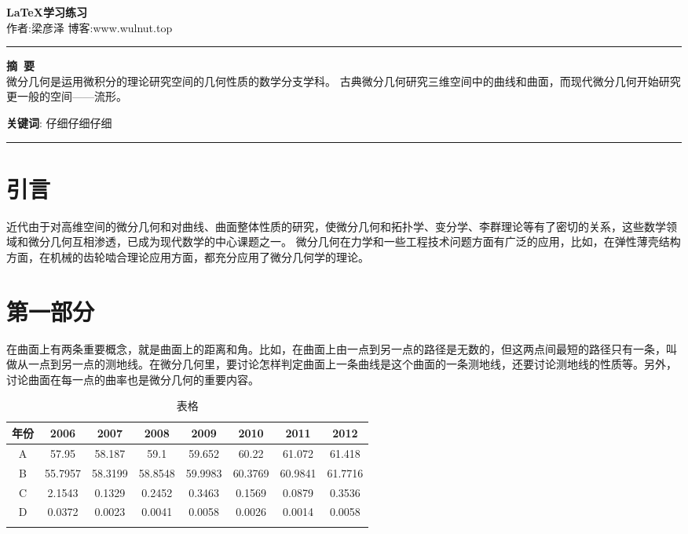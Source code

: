 \documentclass[UTF8, a4paper, 12pt]{ctexart}
\begin{document}

\begin{center}
\LARGE
    \textbf{\LaTeX{}学习练习} \\
    \vspace{0.2em}
    \large
    作者:梁彦泽 \hspace{1cm} 博客:www.wulnut.top \\
    \rule[0.5 \baselineskip]{\textwidth}{0.5pt}
\end{center}




\textbf{摘\ 要} \\
\large
微分几何是运用微积分的理论研究空间的几何性质的数学分支学科。
古典微分几何研究三维空间中的曲线和曲面，而现代微分几何开始研究更一般的空间——流形。


\textbf{关键词}: 仔细\quad 仔细\quad 仔细\quad \\

\begin{center}
\rule[0.1 \baselineskip]{\textwidth}{0.5pt}
\end{center}

\section{引言}
\indent
近代由于对高维空间的微分几何和对曲线、曲面整体性质的研究，使微分几何和拓扑学、变分学、李群理论等有了密切的关系，这些数学领域和微分几何互相渗透，已成为现代数学的中心课题之一。
微分几何在力学和一些工程技术问题方面有广泛的应用，比如，在弹性薄壳结构方面，在机械的齿轮啮合理论应用方面，都充分应用了微分几何学的理论。


\section{第一部分}
\indent
在曲面上有两条重要概念，就是曲面上的距离和角。比如，在曲面上由一点到另一点的路径是无数的，但这两点间最短的路径只有一条，叫做从一点到另一点的测地线。在微分几何里，要讨论怎样判定曲面上一条曲线是这个曲面的一条测地线，还要讨论测地线的性质等。另外，讨论曲面在每一点的曲率也是微分几何的重要内容。


\begin{table}[H]
	\caption{表格}
	\centering
	\begin{tabular}{cccccccc}
		\toprule[1.5pt]
		年份  & 2006&2007&2008&2009&2010 & 2011 & 2012 \\
		\midrule
		A&57.95&58.187&59.1&59.652&60.22&61.072&61.418 \\
		B &55.7957 &58.3199&58.8548&59.9983&60.3769 &60.9841 &61.7716 \\		
		C&2.1543&0.1329&0.2452&0.3463&0.1569&0.0879&0.3536 \\		
		D&0.0372 &0.0023&0.0041&0.0058&0.0026&0.0014&0.0058 \\
		\bottomrule[1.5pt]
		\label{tab1}
	\end{tabular}
\end{table}
\end{document}
